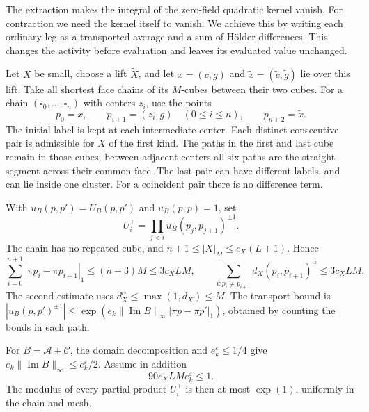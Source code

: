The extraction makes the integral of the zero-field quadratic
kernel vanish. For contraction we need the kernel itself to
vanish. We achieve this by writing each ordinary leg as a
transported average and a sum of H\"older differences. This
changes the activity before evaluation and leaves its evaluated
value unchanged.

Let $X$ be small, choose a lift $\widetilde X$, and let
$x=(c,g)$ and $\tilde x=(\tilde c,\tilde g)$ lie over this lift.
Take all shortest face chains of its $M$-cubes between their
two cubes. For a chain $(\square_0,\ldots,\square_n)$ with
centers $z_i$, use the points
\[
 p_0=x,\qquad p_{i+1}=(z_i,g)\quad(0\le i\le n),\qquad
 p_{n+2}=\tilde x.
\]
The initial label is kept at each intermediate center.
Each distinct consecutive pair is admissible for $X$ of the
first kind. The paths in the first and last cube remain in
those cubes; between adjacent centers all six paths are the
straight segment across their common face. The last pair
can have different labels, and can lie inside one cluster.
For a coincident pair there is no difference term.

With $u_B(p,p')=U_B(p,p')$ and $u_B(p,p)=1$, set
\[
 U_i^\pm=\prod_{j<i}u_B(p_j,p_{j+1})^{\pm1}.
\]
The chain has no repeated cube, and
$n+1\le|X|_M\le c_X(L+1)$. Hence
\begin{equation}\label{eq:rg-chain-length}
 \sum_{i=0}^{n+1}|\pi p_i-\pi p_{i+1}|_1\le(n+3)M
          \le3c_XLM,\qquad
 \sum_{i:p_i\ne p_{i+1}}d_X(p_i,p_{i+1})^\alpha\le3c_XLM.
\end{equation}
The second estimate uses $d_X^\alpha\le\max(1,d_X)\le M$.
The transport bound is
$|u_B(p,p')^{\pm1}|\le\exp(e_k\|\operatorname{Im}B\|_\infty
|\pi p-\pi p'|_1)$, obtained by counting the bonds in each path.

For $B=\mathscr A+\mathscr C$, the domain decomposition and
$e_k^\varepsilon\le1/4$ give
$e_k\|\operatorname{Im}B\|_\infty\le e_k^\varepsilon/2$.
Assume in addition
\begin{equation}\label{eq:rg-adjustment-charge-condition}
 90c_XLM e_k^\varepsilon\le1.
\end{equation}
The modulus of every partial product $U_i^\pm$ is then at most
$\exp(1)$, uniformly in the chain and mesh.

